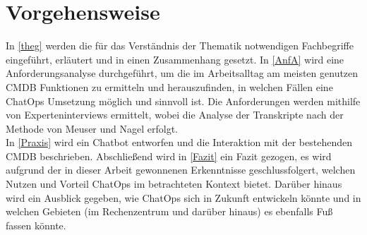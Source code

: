 \section{Vorgehensweise}
In \autoref{theg} werden die für das Verständnis der Thematik notwendigen Fachbegriffe eingeführt, erläutert und in einen Zusammenhang gesetzt. In \autoref{AnfA} wird eine Anforderungsanalyse durchgeführt, um die im Arbeitsalltag am meisten genutzen \acs{CMDB} Funktionen zu ermitteln und herauszufinden, in welchen Fällen eine ChatOps Umsetzung möglich und sinnvoll ist. Die Anforderungen werden mithilfe von Experteninterviews ermittelt, wobei die Analyse der Transkripte nach der Methode von Meuser und Nagel erfolgt.\\
In \autoref{Praxis} wird ein Chatbot entworfen und die Interaktion mit der bestehenden \acs{CMDB} beschrieben.
Abschließend wird in \autoref{Fazit} ein Fazit gezogen, es wird aufgrund der in dieser Arbeit gewonnenen Erkenntnisse geschlussfolgert, welchen Nutzen und Vorteil ChatOps im betrachteten Kontext bietet. Darüber hinaus wird ein Ausblick gegeben, wie ChatOps sich in Zukunft entwickeln könnte und in welchen Gebieten (im Rechenzentrum und darüber hinaus) es ebenfalls Fuß fassen könnte.

